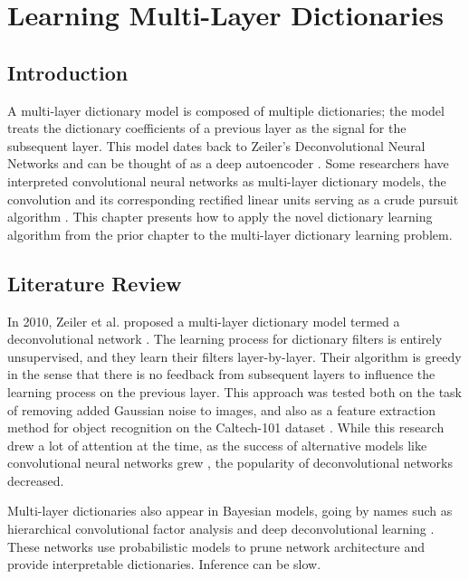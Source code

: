 \chapter{Learning Multi-Layer Dictionaries}
\section{Introduction}
A multi-layer dictionary model is composed of multiple dictionaries; the model treats the dictionary coefficients of a previous layer as the signal for the subsequent layer. This model dates back to Zeiler's Deconvolutional Neural Networks \cite{zeiler2010deconvolutional} and can be thought of as a deep autoencoder \cite[Chapter~14]{Goodfellow2016-DeepLearningBook}\cite{Rangamani2018DictLandAE}. Some researchers have interpreted convolutional neural networks as multi-layer dictionary models, the convolution and its corresponding rectified linear units serving as a crude pursuit algorithm \cite{papyan2017convolutional}. This chapter presents how to apply the novel dictionary learning algorithm from the prior chapter to the multi-layer dictionary learning problem.
\section{Literature Review}
In 2010, Zeiler et al. proposed a multi-layer dictionary model termed a deconvolutional network \cite{zeiler2010deconvolutional}. The learning process for dictionary filters is entirely unsupervised, and they learn their filters layer-by-layer. Their algorithm is greedy in the sense that there is no feedback from subsequent layers to influence the learning process on the previous layer. This approach was tested both on the task of removing added Gaussian noise to images, and also as a feature extraction method for object recognition on the Caltech-101 dataset \cite{fei2004-Caltech101}. While this research drew a lot of attention at the time, as the success of alternative models like convolutional neural networks grew \cite{krizhevsky2012imagenet}, the popularity of deconvolutional networks decreased.

Multi-layer dictionaries also appear in Bayesian models, going by names such as hierarchical convolutional factor analysis \cite{chen2011hierarchical}\cite{chen2013deep} and deep deconvolutional learning \cite{pu2014generative}. These networks use probabilistic models to prune network architecture and provide interpretable dictionaries. Inference can be slow.

